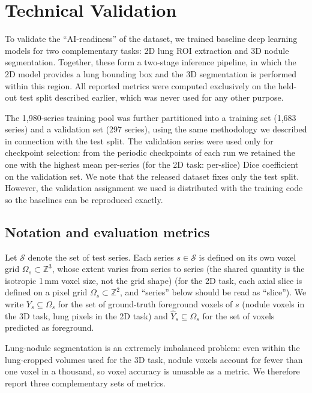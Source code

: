 \section{Technical Validation}
To validate the ``AI-readiness'' of the dataset, we trained baseline deep learning models for two complementary tasks: 2D lung ROI extraction and 3D nodule segmentation. Together, these form a two-stage inference pipeline, in which the 2D model provides a lung bounding box and the 3D segmentation is performed within this region.
All reported metrics were computed exclusively on the held-out test split described earlier, which was never used for any other purpose.

The 1,980-series training pool was further partitioned into a training set (1,683 series) and a validation set (297 series), using the same methodology we described in connection with the test split.
The validation series were used only for checkpoint selection: from the periodic checkpoints of each run we retained the one with the highest mean per-series (for the 2D task: per-slice) Dice coefficient on the validation set.
We note that the released dataset fixes only the test split.
However, the validation assignment we used is distributed with the training code so the baselines can be reproduced exactly.

\subsection{Notation and evaluation metrics}
\label{sec:metrics}
Let $\mathcal{S}$ denote the set of test series. Each series $s \in \mathcal{S}$ is defined on its own voxel grid $\Omega_s \subset \mathbb{Z}^3$, whose extent varies from series to series (the shared quantity is the isotropic 1\,mm voxel size, not the grid shape) (for the 2D task, each axial slice is defined on a pixel grid $\Omega_s \subset \mathbb{Z}^2$, and ``series'' below should be read as ``slice''). We write $Y_s \subseteq \Omega_s$ for the set of ground-truth foreground voxels of $s$ (nodule voxels in the 3D task, lung pixels in the 2D task) and $\hat{Y}_s \subseteq \Omega_s$ for the set of voxels predicted as foreground.

Lung-nodule segmentation is an extremely imbalanced problem: even within the lung-cropped volumes used for the 3D task, nodule voxels account for fewer than one voxel in a thousand, so voxel accuracy is unusable as a metric. We therefore report three complementary sets of metrics.

